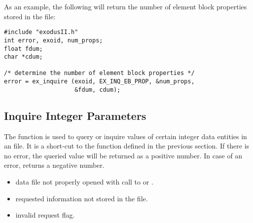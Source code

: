 As an example, the following will return the number of element
block properties stored in the \exo{} file:

\begin{lstlisting}
#include "exodusII.h"
int error, exoid, num_props;
float fdum;
char *cdum;

/* determine the number of element block properties */
error = ex_inquire (exoid, EX_INQ_EB_PROP, &num_props,
                    &fdum, cdum);
\end{lstlisting}


\subsection{Inquire \exo{} Integer Parameters}


The function  is used to query or inquire
values of certain integer data entities in an \exo{} file. It is a
short-cut to the  function defined in the previous
section.  If there is no error, the queried value will be returned as
a positive number. In case of an error,  returns a
negative number.

\begin{itemize}
 \item data file not properly opened with call to  or
 .
 \item requested information not stored in the file.
 \item invalid request flag.
\end{itemize}



